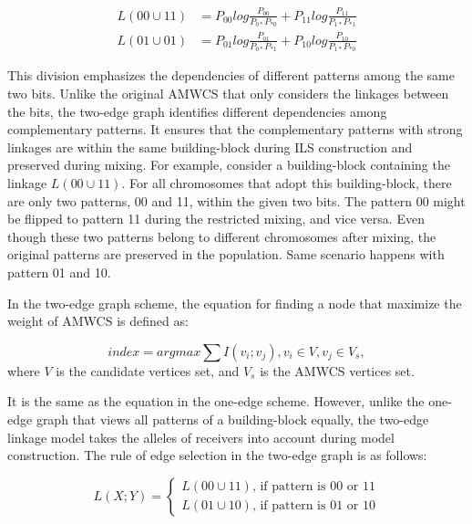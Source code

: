 \documentclass{sig-alternate-05-2015}
\begin{document}
\begin{equation} 
\begin{split}
L( 00 \cup 11 ) &= P_{00 }log\frac{P_{00}}{P_{0*} P_{*0}} + P_{11 }log\frac{P_{11}}{P_{1*} P_{*1}}  \\
L( 01 \cup 01 ) &= P_{01 }log\frac{P_{01}}{P_{0*} P_{*1}} + P_{10 }log\frac{P_{10}}{P_{1*} P_{*0}}  
\end{split}
\end{equation}

This division emphasizes the dependencies of different patterns among the same two bits. Unlike the original AMWCS that only considers the linkages between the bits, the two-edge graph identifies different dependencies among complementary patterns. It ensures that the complementary patterns with strong linkages are within the same building-block during ILS construction and preserved during mixing. For example, consider a building-block containing the linkage $L(00\cup11)$. For all chromosomes that adopt this building-block, there are only two patterns, 00 and 11, within the given two bits. The pattern 00 might be flipped to pattern 11 during the restricted mixing, and vice versa. Even though these two patterns belong to different chromosomes after mixing, the original patterns are preserved in the population. Same scenario happens with pattern 01 and 10.


In the two-edge graph scheme, the equation for finding a node that maximize the weight of AMWCS is defined as:

\begin{equation} \textit{index} = argmax\sum I(v_i;v_j), {v_i\in V}, {v_j \in V_s},\end{equation}
where $V$ is the candidate vertices set, and $V_s$ is the AMWCS vertices set.

 It is the same as the equation in the  one-edge scheme. However, unlike the one-edge graph that views all patterns of a building-block equally, the two-edge linkage model takes the alleles of receivers into account during model construction. The rule of edge selection in the two-edge graph is as follows:

\begin{equation}
L(X;Y) = 
   \begin{cases}
    L(00\cup11) \text{, if pattern is 00 or 11} \\
    L(01\cup10) \text{, if pattern is 01 or 10} 
	\end{cases}
\end{equation}
\end{document}
